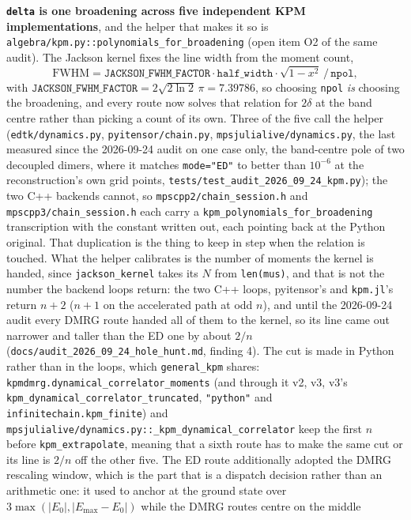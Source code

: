 \documentclass[11pt]{article}
\begin{document}
\textbf{\texttt{delta} is one broadening across five independent KPM
implementations}, and the helper that makes it so is
\texttt{algebra/kpm.py::polynomials\_for\_broadening} (open item O2 of
the same audit). The Jackson kernel fixes the line width from the moment
count,
\[
  \mathrm{FWHM} = \texttt{JACKSON\_FWHM\_FACTOR}\cdot
  \texttt{half\_width}\cdot\sqrt{1-x^2}\,/\,\texttt{npol},
\]
with $\texttt{JACKSON\_FWHM\_FACTOR} = 2\sqrt{2\ln2}\,\pi = 7.39786$, so
choosing \texttt{npol} \emph{is} choosing the broadening, and every route
now solves that relation for $2\delta$ at the band centre rather than
picking a count of its own. Three of the five call the helper
(\texttt{edtk/dynamics.py}, \texttt{pyitensor/chain.py},
\texttt{mpsjulialive/dynamics.py}, the last measured since the
2026-09-24 audit on one case only, the band-centre pole of two decoupled
dimers, where it matches \texttt{mode="ED"} to better than $10^{-6}$ at
the reconstruction's own grid points,
\texttt{tests/test\_audit\_2026\_09\_24\_kpm.py}); the two C++ backends
cannot, so
\texttt{mpscpp2/chain\_session.h} and \texttt{mpscpp3/chain\_session.h}
each carry a \texttt{kpm\_polynomials\_for\_broadening} transcription
with the constant written out, each pointing back at the Python
original. That duplication is the thing to keep in step when the relation
is touched. What the helper calibrates is the number of moments the
kernel is handed, since \texttt{jackson\_kernel} takes its $N$ from
\texttt{len(mus)}, and that is not the number the backend loops return:
the two C++ loops, pyitensor's and \texttt{kpm.jl}'s return $n+2$
($n+1$ on the accelerated path at odd $n$), and until the 2026-09-24
audit every DMRG route handed all of them to the kernel, so its line
came out narrower and taller than the ED one by about $2/n$
(\texttt{docs/audit\_2026\_09\_24\_hole\_hunt.md}, finding 4). The cut
is made in Python rather than in the loops, which
\texttt{general\_kpm} shares:
\texttt{kpmdmrg.dynamical\_correlator\_moments} (and through it v2, v3,
v3's \texttt{kpm\_dynamical\_correlator\_truncated}, \texttt{"python"}
and \texttt{infinitechain.kpm\_finite}) and
\texttt{mpsjulialive/dynamics.py::\_kpm\_dynamical\_correlator} keep the
first $n$ before \texttt{kpm\_extrapolate}, meaning that a sixth route
has to make the same cut or its line is $2/n$ off the other five. The
ED route additionally adopted the DMRG rescaling window,
which is the part that is a dispatch decision rather than an arithmetic
one: it used to anchor at the ground state over
$3\max(|E_0|,|E_{\max}-E_0|)$ while the DMRG routes centre on the middle
\end{document}
